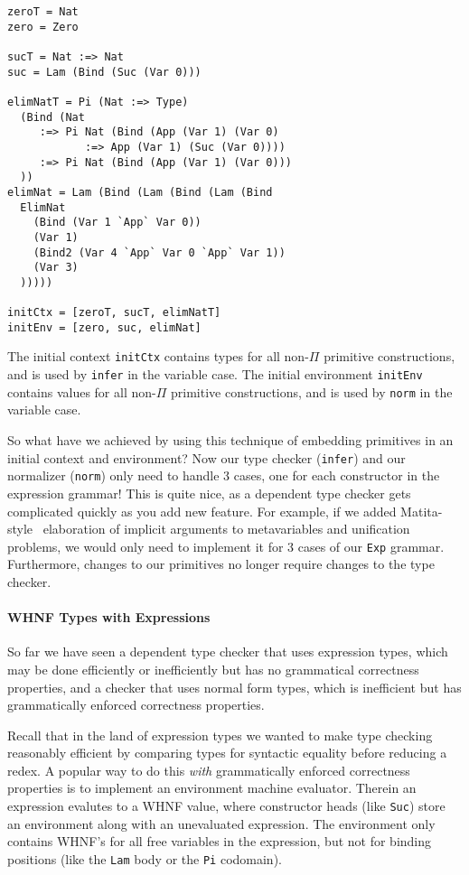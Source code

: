 \documentclass[preprint,authoryear]{sigplanconf}
\begin{document}
\begin{verbatim}
zeroT = Nat
zero = Zero

sucT = Nat :=> Nat
suc = Lam (Bind (Suc (Var 0)))

elimNatT = Pi (Nat :=> Type)
  (Bind (Nat
     :=> Pi Nat (Bind (App (Var 1) (Var 0)
            :=> App (Var 1) (Suc (Var 0))))
     :=> Pi Nat (Bind (App (Var 1) (Var 0)))
  ))
elimNat = Lam (Bind (Lam (Bind (Lam (Bind
  ElimNat
    (Bind (Var 1 `App` Var 0))
    (Var 1)
    (Bind2 (Var 4 `App` Var 0 `App` Var 1))
    (Var 3)
  )))))

initCtx = [zeroT, sucT, elimNatT]
initEnv = [zero, suc, elimNat]
\end{verbatim}

The initial context \texttt{initCtx} contains types for all
non-$\Pi$ primitive constructions, and is used by \texttt{infer} in the
variable case.
The initial environment \texttt{initEnv} contains values for all
non-$\Pi$ primitive constructions, and is used by \texttt{norm} in the
variable case.

So what have we achieved by using this technique of embedding primitives
in an initial context and environment? Now our type checker
(\texttt{infer}) and our normalizer (\texttt{norm}) only need to
handle 3 cases, one for each constructor in the expression grammar!
This is quite nice, as a dependent type checker gets complicated
quickly as you add new feature. For example, if we added
Matita-style~\cite{TODO} elaboration of implicit arguments to
metavariables and unification problems, we would only need to
implement it for 3 cases of our \texttt{Exp} grammar.
Furthermore, changes to our primitives no longer require changes to
the type checker.

\paragraph{WHNF Types with Expressions}

So far we have seen a dependent type checker that uses
expression types, which may be done efficiently or inefficiently but
has no grammatical correctness properties, and a checker that uses
normal form types, which is inefficient but has grammatically enforced
correctness properties.

Recall that in the land of expression types we wanted to
make type checking reasonably efficient by
comparing types for syntactic equality before reducing a redex.
A popular way to do this {\it with} grammatically enforced correctness
properties is to implement an environment machine evaluator. Therein
an expression evalutes to a WHNF value, where constructor heads
(like \texttt{Suc}) store an environment along with an unevaluated
expression. The environment only contains WHNF's for all free
variables in the expression, but not for binding positions (like the
\texttt{Lam} body or the \texttt{Pi} codomain).
\end{document}

